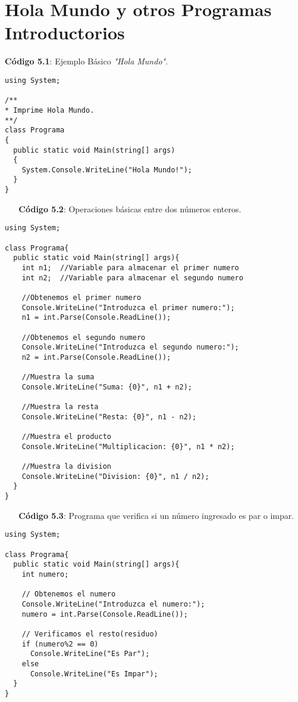 

\section{Hola Mundo y otros Programas Introductorios}

\textbf{C\'odigo 5.1}: Ejemplo B\'asico \textit{"Hola Mundo"}.
\begin{lstlisting}
using System;

/**
* Imprime Hola Mundo.
**/
class Programa
{
  public static void Main(string[] args)
  {
    System.Console.WriteLine("Hola Mundo!");
  }
}
\end{lstlisting}

~\newline
~\newline
\textbf{C\'odigo 5.2}: Operaciones b\'asicas entre dos n\'umeros enteros.
\begin{lstlisting}[frame=single]
using System;

class Programa{
  public static void Main(string[] args){
    int n1;  //Variable para almacenar el primer numero
    int n2;  //Variable para almacenar el segundo numero
		
    //Obtenemos el primer numero
    Console.WriteLine("Introduzca el primer numero:");
    n1 = int.Parse(Console.ReadLine());
		
    //Obtenemos el segundo numero
    Console.WriteLine("Introduzca el segundo numero:");		
    n2 = int.Parse(Console.ReadLine());
		
    //Muestra la suma
    Console.WriteLine("Suma: {0}", n1 + n2);
		
    //Muestra la resta		
    Console.WriteLine("Resta: {0}", n1 - n2);
		
    //Muestra el producto		
    Console.WriteLine("Multiplicacion: {0}", n1 * n2);
		
    //Muestra la division		
    Console.WriteLine("Division: {0}", n1 / n2);
  }
}
\end{lstlisting}

~\newline
~\newline
\textbf{C\'odigo 5.3}: Programa que verifica si un n\'umero ingresado es par o impar.
\begin{lstlisting}[frame=single]
using System;

class Programa{
  public static void Main(string[] args){
    int numero;
		
    // Obtenemos el numero
    Console.WriteLine("Introduzca el numero:");
    numero = int.Parse(Console.ReadLine());
		
    // Verificamos el resto(residuo)
    if (numero%2 == 0)
      Console.WriteLine("Es Par");
    else
      Console.WriteLine("Es Impar");
  }
}
\end{lstlisting}

